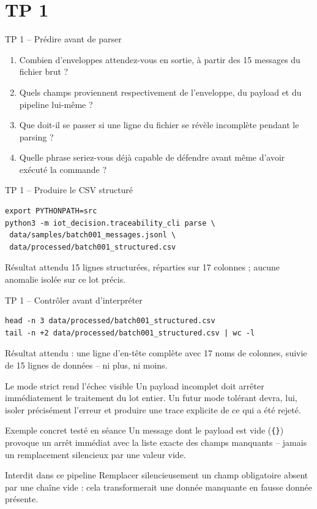 \documentclass[aspectratio=169]{beamer}
\begin{document}
\section{TP 1}
\begin{frame}{TP 1 -- Prédire avant de parser}
\begin{enumerate}
\item Combien d'enveloppes attendez-vous en sortie, à partir des 15 messages du fichier brut ?
\item Quels champs proviennent respectivement de l'enveloppe, du payload et du pipeline lui-même ?
\item Que doit-il se passer si une ligne du fichier se révèle incomplète pendant le parsing ?
\item Quelle phrase seriez-vous déjà capable de défendre avant même d'avoir exécuté la commande ?
\end{enumerate}
\end{frame}

\begin{frame}[fragile]{TP 1 -- Produire le CSV structuré}
\scriptsize
\begin{verbatim}
export PYTHONPATH=src
python3 -m iot_decision.traceability_cli parse \
 data/samples/batch001_messages.jsonl \
 data/processed/batch001_structured.csv
\end{verbatim}
\begin{block}{Résultat attendu}
15 lignes structurées, réparties sur 17 colonnes ; aucune anomalie isolée sur ce lot précis.
\end{block}
\end{frame}

\begin{frame}[fragile]{TP 1 -- Contrôler avant d'interpréter}
\small
\begin{verbatim}
head -n 3 data/processed/batch001_structured.csv
tail -n +2 data/processed/batch001_structured.csv | wc -l
\end{verbatim}
Résultat attendu : une ligne d'en-tête complète avec 17 noms de colonnes, suivie de 15 lignes de données -- ni plus, ni moins.
\end{frame}

\begin{frame}{Le mode strict rend l'échec visible}
Un payload incomplet doit arrêter immédiatement le traitement du lot entier. Un futur mode tolérant devra, lui, isoler précisément l'erreur et produire une trace explicite de ce qui a été rejeté.
\begin{exampleblock}{Exemple concret testé en séance}
Un message dont le payload est vide (\texttt{\{\}}) provoque un arrêt immédiat avec la liste exacte des champs manquants -- jamais un remplacement silencieux par une valeur vide.
\end{exampleblock}
\begin{alertblock}{Interdit dans ce pipeline}
Remplacer silencieusement un champ obligatoire absent par une chaîne vide : cela transformerait une donnée manquante en fausse donnée présente.
\end{alertblock}
\end{frame}
\end{document}
